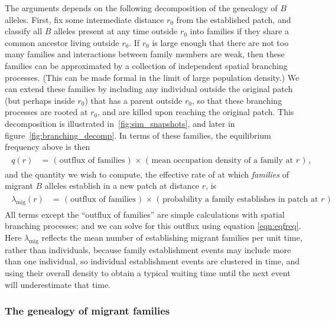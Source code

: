 \documentclass{article}
\newcommand{\migrate}{\lambda_\text{mig}}
\begin{document}
The arguments depends on the following decomposition of the genealogy of $B$ alleles.
First, fix some intermediate distance $r_0$ from the established patch,
and classify all $B$ alleles present at any time outside $r_0$ into families
if they share a common ancestor living outside $r_0$.
If $r_0$ is large enough that there are not too many families
and interactions between family members are weak,
then these families can be approximated by a collection of independent spatial branching processes.
(This can be made formal in the limit of large population density.)
We can extend these families by 
including any individual outside the original patch (but perhaps inside $r_0$) 
that has a parent outside $r_0$,
so that these branching processes are rooted at $r_0$, and are killed upon reaching the original patch.
This decomposition is illustrated in~\ref{fig:sim_snapshots}, and later in figure~\ref{fig:branching_decomp}.
In terms of these families, the equilibrium frequency above is then
\begin{align}
    \label{eqn:gestalt_q}
    \begin{split}
        q(r) &= \text{ ( outflux of families ) } \times \text{ ( mean occupation density of a family at $r$ ) } ,
\end{split}
\end{align}
and the quantity we wish to compute,
the effective rate of at which \emph{families} of migrant $B$ alleles establish in a new patch at distance $r$, 
is
\begin{align}
    \label{eqn:gestalt_migrate}
    \begin{split}
        \migrate(r) &= \text{ ( outflux of families ) } \times \text{ ( probability a family establishes in patch at $r$ ) }
    \end{split}
\end{align}
All terms except the ``outflux of families'' are simple calculations with spatial branching processes;
and we can solve for this outflux using equation \eqref{eqn:eqfreq}.
Here $\migrate$ reflects the mean number of establishing migrant families per unit time,
rather than individuals,
because family establishment events may include more than one individual,
so individual establishment events are clustered in time,
and using their overall density to obtain a typical waiting time until the next event
will underestimate that time.


\subsubsection{The genealogy of migrant families}
\end{document}
